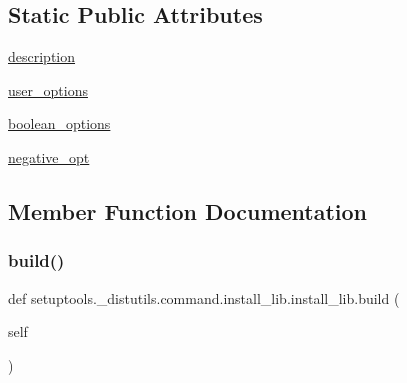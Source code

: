 \subsection*{Static Public Attributes}
\begin{DoxyCompactItemize}
\item 
\hyperlink{classsetuptools_1_1__distutils_1_1command_1_1install__lib_1_1install__lib_ac2046baa3e258f895f36043d22ba6a9e}{description}
\item 
\hyperlink{classsetuptools_1_1__distutils_1_1command_1_1install__lib_1_1install__lib_aa982785fe6c7aae0440a3624fa909804}{user\+\_\+options}
\item 
\hyperlink{classsetuptools_1_1__distutils_1_1command_1_1install__lib_1_1install__lib_af118fc0850a49cb10166d5ec73659448}{boolean\+\_\+options}
\item 
\hyperlink{classsetuptools_1_1__distutils_1_1command_1_1install__lib_1_1install__lib_a8f8dfea1f95aa9f74e97671c93dfa818}{negative\+\_\+opt}
\end{DoxyCompactItemize}


\subsection{Member Function Documentation}
\mbox{\label{classsetuptools_1_1__distutils_1_1command_1_1install__lib_1_1install__lib_a8be54c86c5c89436d295b32d917407fc}} 
\subsubsection{\texorpdfstring{build()}{build()}}
{\footnotesize\ttfamily def setuptools.\+\_\+distutils.\+command.\+install\+\_\+lib.\+install\+\_\+lib.\+build (\begin{DoxyParamCaption}\item[{}]{self }\end{DoxyParamCaption})}

\mbox{\label{classsetuptools_1_1__distutils_1_1command_1_1install__lib_1_1install__lib_a18efba012f527ae4595d5c652b5e30a2}} 
